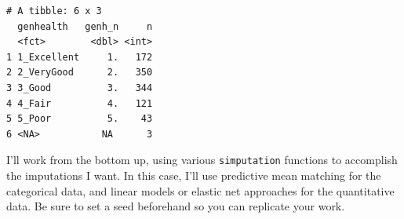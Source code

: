 \documentclass[]{book}
\newenvironment{Shaded}{\begin{snugshade}}{\end{snugshade}}
\newcommand{\KeywordTok}[1]{\textcolor[rgb]{0.13,0.29,0.53}{\textbf{#1}}}
\newcommand{\DataTypeTok}[1]{\textcolor[rgb]{0.13,0.29,0.53}{#1}}
\newcommand{\DecValTok}[1]{\textcolor[rgb]{0.00,0.00,0.81}{#1}}
\newcommand{\StringTok}[1]{\textcolor[rgb]{0.31,0.60,0.02}{#1}}
\newcommand{\OperatorTok}[1]{\textcolor[rgb]{0.81,0.36,0.00}{\textbf{#1}}}
\newcommand{\NormalTok}[1]{#1}
\theoremstyle{definition}
\theoremstyle{definition}
\theoremstyle{definition}
\theoremstyle{remark}
\begin{document}
\begin{Shaded}
\end{Shaded}

\begin{verbatim}
# A tibble: 6 x 3
  genhealth   genh_n     n
  <fct>        <dbl> <int>
1 1_Excellent     1.   172
2 2_VeryGood      2.   350
3 3_Good          3.   344
4 4_Fair          4.   121
5 5_Poor          5.    43
6 <NA>           NA      3
\end{verbatim}

I'll work from the bottom up, using various \texttt{simputation}
functions to accomplish the imputations I want. In this case, I'll use
predictive mean matching for the categorical data, and linear models or
elastic net approaches for the quantitative data. Be sure to set a seed
beforehand so you can replicate your work.

\begin{Shaded}
\end{Shaded}
\end{document}
